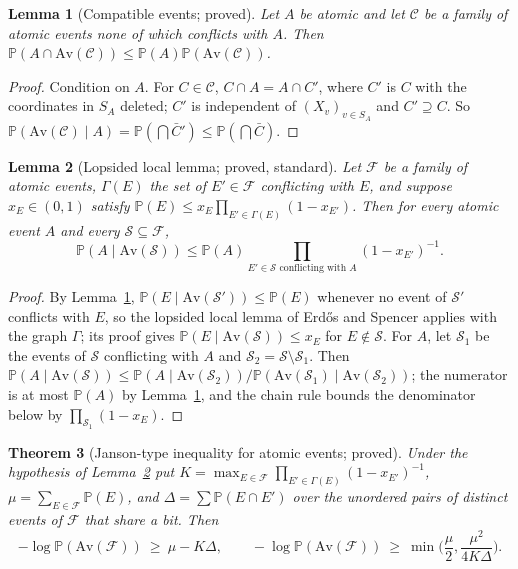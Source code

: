 \documentclass[11pt,reqno]{amsart}
\newtheorem{theorem}{Theorem}[section]
\newtheorem{lemma}[theorem]{Lemma}
\theoremstyle{definition}
\newcommand{\PP}{\mathbb P}
\begin{document}
\begin{lemma}[Compatible events; proved]\label{lem:compat}
Let $A$ be atomic and let $\mathcal C$ be a family of atomic events none of
which conflicts with $A$.  Then $\PP(A\cap\mathrm{Av}(\mathcal C))\le\PP(A)\PP(\mathrm{Av}(\mathcal C))$.
\end{lemma}

\begin{proof}
Condition on $A$.  For $C\in\mathcal C$, $C\cap A=A\cap C'$, where $C'$ is $C$
with the coordinates in $S_A$ deleted; $C'$ is independent of
$(X_v)_{v\in S_A}$ and $C'\supseteq C$.  So
$\PP(\mathrm{Av}(\mathcal C)\mid A)=\PP(\bigcap\bar C')\le\PP(\bigcap\bar C)$.
\end{proof}

\begin{lemma}[Lopsided local lemma; proved, standard]\label{lem:lopsided}
Let $\mathcal F$ be a family of atomic events, $\Gamma(E)$ the set of
$E'\in\mathcal F$ conflicting with $E$, and suppose $x_E\in(0,1)$ satisfy
$\PP(E)\le x_E\prod_{E'\in\Gamma(E)}(1-x_{E'})$.  Then for every atomic event $A$
and every $\mathcal S\subseteq\mathcal F$,
\[
 \PP(A\mid\mathrm{Av}(\mathcal S))\le\PP(A)\prod_{E'\in\mathcal S\text{ conflicting with }A}(1-x_{E'})^{-1}.
\]
\end{lemma}

\begin{proof}
By Lemma~\ref{lem:compat}, $\PP(E\mid\mathrm{Av}(\mathcal S'))\le\PP(E)$ whenever
no event of $\mathcal S'$ conflicts with $E$, so the lopsided local lemma of
Erd\H{o}s and Spencer \cite{ErdosSpencer} applies with the graph $\Gamma$; its
proof gives $\PP(E\mid\mathrm{Av}(\mathcal S))\le x_E$ for $E\notin\mathcal S$.  For
$A$, let $\mathcal S_1$ be the events of $\mathcal S$ conflicting with $A$ and
$\mathcal S_2=\mathcal S\setminus\mathcal S_1$.  Then
$\PP(A\mid\mathrm{Av}(\mathcal S))\le\PP(A\mid\mathrm{Av}(\mathcal S_2))/\PP(\mathrm{Av}(\mathcal S_1)\mid\mathrm{Av}(\mathcal S_2))$;
the numerator is at most $\PP(A)$ by Lemma~\ref{lem:compat}, and the chain
rule bounds the denominator below by $\prod_{\mathcal S_1}(1-x_E)$.
\end{proof}

\begin{theorem}[Janson-type inequality for atomic events; proved]\label{thm:janson}
Under the hypothesis of Lemma~\ref{lem:lopsided} put
$K=\max_{E\in\mathcal F}\prod_{E'\in\Gamma(E)}(1-x_{E'})^{-1}$,
$\mu=\sum_{E\in\mathcal F}\PP(E)$, and
$\Delta=\sum\PP(E\cap E')$ over the unordered pairs of distinct events of
$\mathcal F$ that share a bit.  Then
\[
 -\log\PP(\mathrm{Av}(\mathcal F))\ \ge\ \mu-K\Delta,\qquad
 -\log\PP(\mathrm{Av}(\mathcal F))\ \ge\ \min\Big(\frac\mu2,\frac{\mu^2}{4K\Delta}\Big).
\]
\end{theorem}
\end{document}
